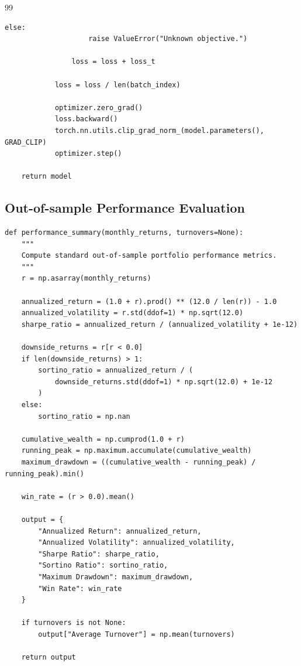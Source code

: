 \documentclass[11pt]{article}
\begin{document}
\begin{thebibliography}{99}
\begin{lstlisting}[style=appendixpython,caption={Warm-start training and E2E fine-tuning procedure}]
                else:
                    raise ValueError("Unknown objective.")

                loss = loss + loss_t

            loss = loss / len(batch_index)

            optimizer.zero_grad()
            loss.backward()
            torch.nn.utils.clip_grad_norm_(model.parameters(), GRAD_CLIP)
            optimizer.step()

    return model
\end{lstlisting}

\subsection{Out-of-sample Performance Evaluation}

\begin{lstlisting}[style=appendixpython,caption={Performance evaluation metrics}]
def performance_summary(monthly_returns, turnovers=None):
    """
    Compute standard out-of-sample portfolio performance metrics.
    """
    r = np.asarray(monthly_returns)

    annualized_return = (1.0 + r).prod() ** (12.0 / len(r)) - 1.0
    annualized_volatility = r.std(ddof=1) * np.sqrt(12.0)
    sharpe_ratio = annualized_return / (annualized_volatility + 1e-12)

    downside_returns = r[r < 0.0]
    if len(downside_returns) > 1:
        sortino_ratio = annualized_return / (
            downside_returns.std(ddof=1) * np.sqrt(12.0) + 1e-12
        )
    else:
        sortino_ratio = np.nan

    cumulative_wealth = np.cumprod(1.0 + r)
    running_peak = np.maximum.accumulate(cumulative_wealth)
    maximum_drawdown = ((cumulative_wealth - running_peak) / running_peak).min()

    win_rate = (r > 0.0).mean()

    output = {
        "Annualized Return": annualized_return,
        "Annualized Volatility": annualized_volatility,
        "Sharpe Ratio": sharpe_ratio,
        "Sortino Ratio": sortino_ratio,
        "Maximum Drawdown": maximum_drawdown,
        "Win Rate": win_rate
    }

    if turnovers is not None:
        output["Average Turnover"] = np.mean(turnovers)

    return output
\end{lstlisting}

\end{thebibliography}
\end{document}
